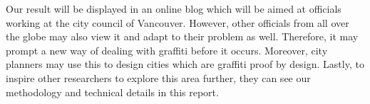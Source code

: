 Our result will be displayed in an online blog which will be aimed at officials working at the city council of Vancouver.
However, other officials from all over the globe may also view it and adapt to their problem as well.
Therefore, it may prompt a new way of dealing with graffiti before it occurs.
Moreover, city planners may use this to design cities which are graffiti proof by design.
Lastly, to inspire other researchers to explore this area further, they can see our methodology and technical details in this report.